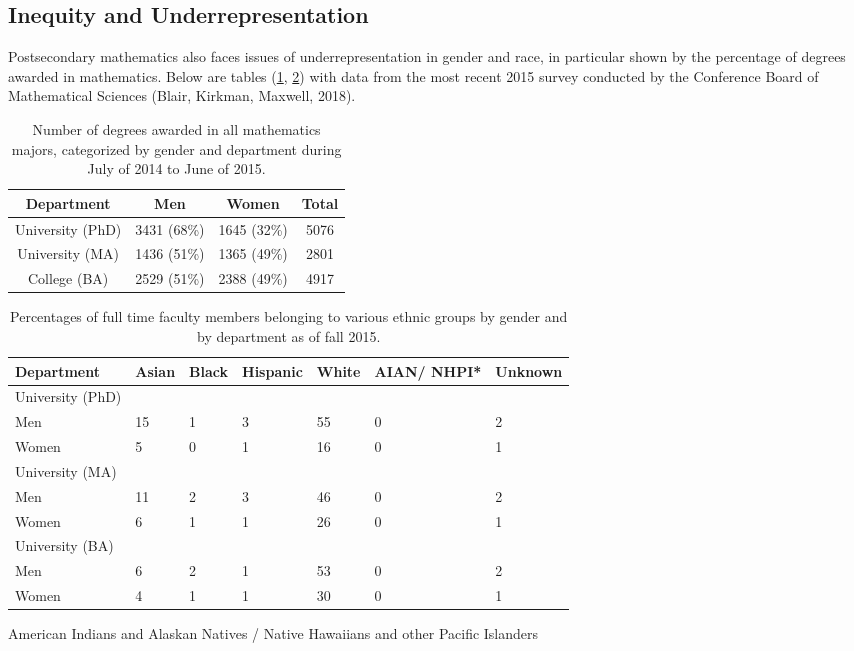 \subsection{Inequity and Underrepresentation}
Postsecondary mathematics also faces issues of underrepresentation in gender and race, in particular shown by the percentage of degrees awarded in mathematics. Below are tables (\ref{table:gender}, \ref{table:race}) with data from the most recent 2015 survey conducted by the Conference Board of Mathematical Sciences (Blair, Kirkman, Maxwell, 2018).
\begin{table}[!htb]
  \begin{center}
    \begin{tabular}{c | c | c | c}
      Department & Men & Women & Total\\ \hline
      University (PhD) & 3431 (68\%) & 1645 (32\%) & 5076\\
      University (MA) & 1436 (51\%) & 1365 (49\%) & 2801\\
      College (BA) & 2529 (51\%) & 2388 (49\%) & 4917
    \end{tabular}
  \end{center}
  \caption{Number of degrees awarded in all mathematics majors, categorized by gender and department during July of 2014 to June of 2015.}
  \label{table:gender}
\end{table}

\begin{table}[!htb]
  \begin{center}
    \begin{tabular}{l | l | l | l | l | p{1.2cm} | l}
      Department & Asian & Black & Hispanic & White & AIAN/ NHPI* & Unknown\\ \hline
      University (PhD)&&&&&\\
      Men & 15 & 1 & 3 & 55 & 0 & 2\\
      Women & 5 & 0 & 1 & 16 & 0 & 1\\ \hline
      University (MA)&&&&&\\
      Men & 11 & 2 & 3 & 46 & 0 & 2\\
      Women & 6 & 1 & 1 & 26 & 0 & 1\\ \hline
      University (BA)&&&&&\\
      Men & 6 & 2 & 1 & 53 & 0 & 2\\
      Women & 4 & 1 & 1 & 30 & 0 & 1
    \end{tabular}
  \end{center}
  {\footnotesize *American Indians and Alaskan Natives / Native Hawaiians and other Pacific Islanders}
  \caption{Percentages of full time faculty members belonging to various ethnic groups by gender and by department as of fall 2015.}
  \label{table:race}
\end{table}

